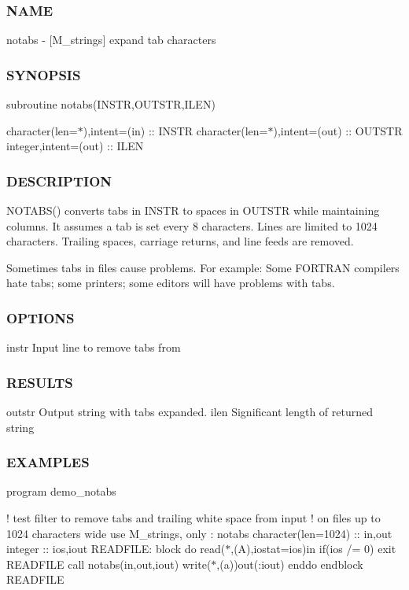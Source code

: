 \subsubsection*{N\+A\+ME}

notabs -\/ \mbox{[}M\+\_\+strings\mbox{]} expand tab characters \subsubsection*{S\+Y\+N\+O\+P\+S\+IS}

subroutine notabs(\+I\+N\+S\+T\+R,\+O\+U\+T\+S\+T\+R,\+I\+L\+E\+N)

character(len=$\ast$),intent=(in) \+:\+: I\+N\+S\+TR character(len=$\ast$),intent=(out) \+:\+: O\+U\+T\+S\+TR integer,intent=(out) \+:\+: I\+L\+EN

\subsubsection*{D\+E\+S\+C\+R\+I\+P\+T\+I\+ON}

N\+O\+T\+A\+B\+S() converts tabs in I\+N\+S\+TR to spaces in O\+U\+T\+S\+TR while maintaining columns. It assumes a tab is set every 8 characters. Lines are limited to 1024 characters. Trailing spaces, carriage returns, and line feeds are removed.

Sometimes tabs in files cause problems. For example\+: Some F\+O\+R\+T\+R\+AN compilers hate tabs; some printers; some editors will have problems with tabs.

\subsubsection*{O\+P\+T\+I\+O\+NS}

instr Input line to remove tabs from

\subsubsection*{R\+E\+S\+U\+L\+TS}

outstr Output string with tabs expanded. ilen Significant length of returned string

\subsubsection*{E\+X\+A\+M\+P\+L\+ES}

program demo\+\_\+notabs

! test filter to remove tabs and trailing white space from input ! on files up to 1024 characters wide use M\+\_\+strings, only \+: notabs character(len=1024) \+:\+: in,out integer \+:\+: ios,iout R\+E\+A\+D\+F\+I\+LE\+: block do read($\ast$,\textquotesingle{}(A)\textquotesingle{},iostat=ios)in if(ios /= 0) exit R\+E\+A\+D\+F\+I\+LE call notabs(in,out,iout) write($\ast$,\textquotesingle{}(a)\textquotesingle{})out(\+:iout) enddo endblock R\+E\+A\+D\+F\+I\+LE

